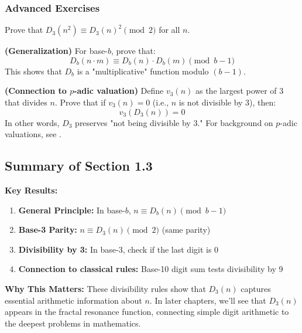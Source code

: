 \subsubsection*{Advanced Exercises}

\begin{exercise}
Prove that $D_3(n^2) \equiv D_3(n)^2 \pmod{2}$ for all $n$.
\end{exercise}

\begin{exercise}
\textbf{(Generalization)} For base-$b$, prove that:
\begin{equation}
D_b(n \cdot m) \equiv D_b(n) \cdot D_b(m) \pmod{b-1}
\end{equation}
This shows that $D_b$ is a "multiplicative" function modulo $(b-1)$.
\end{exercise}

\begin{exercise}
\textbf{(Connection to $p$-adic valuation)} Define $v_3(n)$ as the largest power of 3 that divides $n$. Prove that if $v_3(n) = 0$ (i.e., $n$ is not divisible by 3), then:
\begin{equation}
v_3(D_3(n)) = 0
\end{equation}
In other words, $D_3$ preserves "not being divisible by 3." For background on $p$-adic valuations, see \cite{koblitz1984,gouvea1997}.
\end{exercise}

\subsection{Summary of Section 1.3}

\textbf{Key Results:}
\begin{enumerate}
\item \textbf{General Principle:} In base-$b$, $n \equiv D_b(n) \pmod{b-1}$
\item \textbf{Base-3 Parity:} $n \equiv D_3(n) \pmod{2}$ (same parity)
\item \textbf{Divisibility by 3:} In base-3, check if the last digit is 0
\item \textbf{Connection to classical rules:} Base-10 digit sum tests divisibility by 9
\end{enumerate}

\textbf{Why This Matters:} These divisibility rules show that $D_3(n)$ captures essential arithmetic information about $n$. In later chapters, we'll see that $D_3(n)$ appears in the fractal resonance function, connecting simple digit arithmetic to the deepest problems in mathematics.

